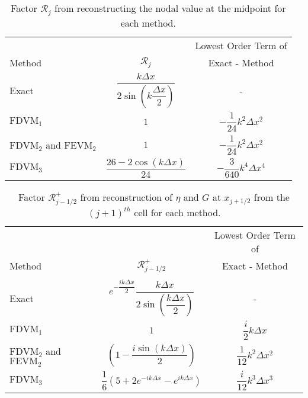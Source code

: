 \begin{table}
	\centering
	\begin{tabular}{l  c  c}
		&&Lowest Order Term of	\\
		Method& $\mathcal{R}_j$& Exact - Method  \B \\
		\hline 
		Exact &$\dfrac{k\Delta x}{2 \sin \left(k\dfrac{\Delta x}{2}\right)}$ & - \T \B \\
		$\text{FDVM}_1$ & $1$ & $-\dfrac{1}{24}k^2 \Delta x^2$ \T \B \\
		$\text{FDVM}_2$ and $\text{FEVM}_2$& $1$ & $-\dfrac{1}{24}k^2 \Delta x^2$ \T \B \\
		$\text{FDVM}_3$& $\dfrac{26 - 2 \cos\left(k \Delta x\right)}{24}$ & $-\dfrac{3}{640}k^4 \Delta x^4$ \T \B  \\
		\hline	\end{tabular}
	\caption{Factor $\mathcal{R}_j$ from reconstructing the nodal value at the midpoint for each method.}
	\label{tab:Mfactor}
\end{table}
\begin{table}
	\centering
	\begin{tabular}{l  c  c}
		&&Lowest Order Term of	\\
		Method & $\mathcal{R}^+_{j-1/2}$ & Exact - Method \B\\
		\hline \\
		Exact & $e^{-\dfrac{ik\Delta x}{2}}\dfrac{k\Delta x}{2 \sin\left(\dfrac{k \Delta x}{2}\right)}$ & -  \\
		$\text{FDVM}_1$ & $1$ & $\dfrac{i}{2}k \Delta x$ \T\B \\
		$\text{FDVM}_2$ and $\text{FEVM}_2$& $ \left(1 - \dfrac{i \sin\left(k\Delta x \right)}{2} \right)$ & $\dfrac{1}{12}k^2 \Delta x^2$  \T\B\\
		$\text{FDVM}_3$& $\dfrac{1}{6}\left({5 + 2e^{-i k {\Delta x}} - e^{i k {\Delta x}}} \right)$ & $\dfrac{i}{12}k^3 \Delta x^3$  \T\B \\
		\hline
	\end{tabular}
	\caption{Factor $\mathcal{R}^+_{j-1/2}$ from reconstruction of $\eta$ and $G$ at $x_{j+1/2}$ from the ${(j+1)^{th}}$ cell for each method. }
	\label{tab:Rpfactor}
\end{table}
